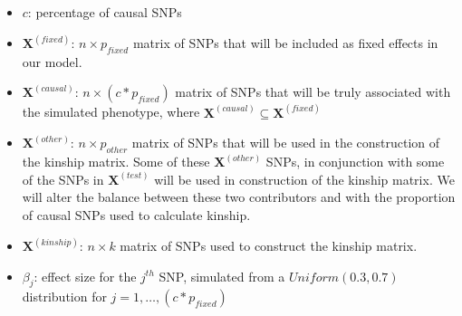 \documentclass[12pt,letter]{article}\usepackage[]{graphicx}\usepackage[]{color}
\newcommand{\bX}{\textbf{X}}
\begin{document}
\begin{itemize}
	\item $c$: percentage of causal SNPs
	\item $\bX^{(fixed)}$: $n \times p_{fixed}$ matrix of SNPs that will be included as fixed effects in our model.
	\item $\bX^{(causal)}$: $n \times (c*p_{fixed})$ matrix of SNPs that will be truly associated with the simulated phenotype, where $\bX^{(causal)} \subseteq \bX^{(fixed)}$
	\item $\bX^{(other)}$: $n \times p_{other}$ matrix of SNPs that will be used in the construction of the kinship matrix. Some of these $\bX^{(other)}$ SNPs, in conjunction with some of the SNPs in $\bX^{(test)}$ will be used in construction of the kinship matrix. We will alter the balance between these two contributors and with the proportion of causal SNPs used to calculate kinship.
	\item $\bX^{(kinship)}$: $n \times k$ matrix of SNPs used to construct the kinship matrix.
	\item $\beta_j$: effect size for the $j^{th}$ SNP, simulated from a $Uniform(0.3,0.7)$ distribution for $j = 1, \ldots, (c*p_{fixed})$
\end{itemize}
\end{document}
